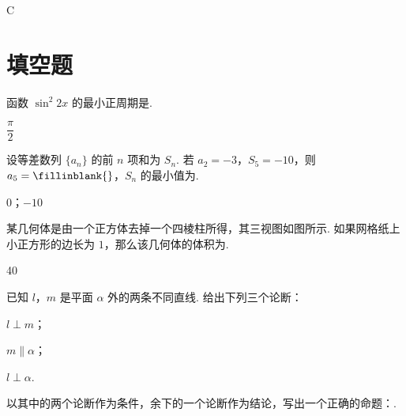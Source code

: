 \begin{answer}
C
\end{answer}


\section{填空题}

\begin{problem}
函数 \(\sin^2 2x\) 的最小正周期是\fillinblank{}.
\end{problem}

\begin{answer}
\(\dfrac{\pi}{2}\)
\end{answer}



\begin{problem}
设等差数列 \(\{a_n\}\) 的前 \(n\) 项和为 \(S_n\). 若 \(a_2=-3\)，\(S_5=-10\)，则 \(a_5=\fillinblank{}\)，\(S_n\) 的最小值为\fillinblank{}.
\end{problem}

\begin{answer}
\(0\)；\(-10\)
\end{answer}



\begin{problem}
某几何体是由一个正方体去掉一个四棱柱所得，其三视图如图所示. 如果网格纸上小正方形的边长为 \(1\)，那么该几何体的体积为\fillinblank{}.

\end{problem}

\begin{answer}
40
\end{answer}



\begin{problem}
已知 \(l\)，\(m\) 是平面 \(\alpha\) 外的两条不同直线. 给出下列三个论断：

\begin{circlelist}
\item \(l\perp m\)；

\item \(m\parallel\alpha\)；

\item \(l\perp\alpha\).
\end{circlelist}
以其中的两个论断作为条件，余下的一个论断作为结论，写出一个正确的命题：\fillinblank{}.
\end{problem}

